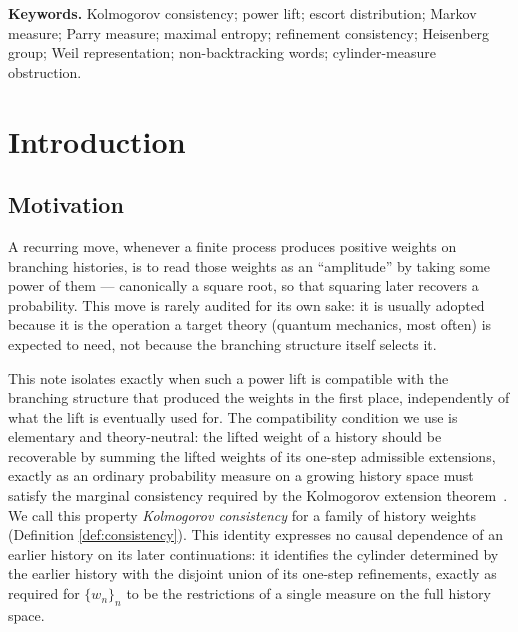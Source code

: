 \documentclass[11pt,a4paper]{article}
\theoremstyle{definition}
\theoremstyle{remark}
\begin{document}
\begin{abstract}
\smallskip
\noindent\textbf{Interpretive outlook.}
The following reading is structural, not a further result: within the Cosmochrony
programme's search for an amplitude modulus, this obstruction means the intuitive move
of silently taking a square root of a branching probability is not free. Any future
construction must therefore either replace the pointwise power lift by a genuinely
different construction --- escort renormalisation being one example --- or decline to
require classical cylinder-measure consistency of the lifted modulus, with that choice
justified independently.
\end{abstract}

\noindent\textbf{Keywords.}
Kolmogorov consistency; power lift; escort distribution; Markov measure; Parry measure;
maximal entropy; refinement consistency; Heisenberg group; Weil representation;
non-backtracking words; cylinder-measure obstruction.

\newpage
\tableofcontents

\newpage
\section{Introduction}
\label{sec:introduction}

\subsection{Motivation}
\label{sec:motivation}

A recurring move, whenever a finite process produces positive weights on branching
histories, is to read those weights as an ``amplitude'' by taking some power of them ---
canonically a square root, so that squaring later recovers a probability. This move is
rarely audited for its own sake: it is usually adopted because it is the operation a
target theory (quantum mechanics, most often) is expected to need, not because the
branching structure itself selects it.

This note isolates exactly when such a power lift is compatible with the branching
structure that produced the weights in the first place, independently of what the lift
is eventually used for. The compatibility condition we use is elementary and
theory-neutral: the lifted weight of a history should be recoverable by summing the
lifted weights of its one-step admissible extensions, exactly as an ordinary
probability measure on a growing history space must satisfy the marginal consistency
required by the Kolmogorov extension theorem~\cite{Billingsley1995}. We call this
property \emph{Kolmogorov consistency} for a family of history weights (Definition
\ref{def:consistency}). This identity expresses no causal dependence of an earlier
history on its later continuations: it identifies the cylinder determined by the
earlier history with the disjoint union of its one-step refinements, exactly as
required for $\{w_n\}_n$ to be the restrictions of a single measure on the full history
space.
\end{document}
